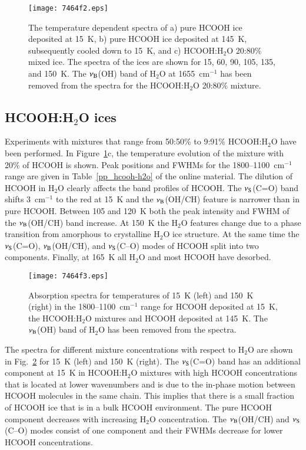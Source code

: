 \documentclass{aa}
\begin{document}
\begin{figure*}
\centering
\texttt{[image: 7464f2.eps]}
\caption{The temperature dependent spectra of a) pure HCOOH ice
deposited at 15~K, b) pure HCOOH ice deposited at 145~K, subsequently
cooled down to 15~K, and c) HCOOH:H$_2$O 20:80\% mixed ice. The
spectra of the ices are shown for 15, 60, 90, 105, 135, and 150~K. The
$\nu_{\rm B}$(OH) band of H$_2$O at 1655~cm$^{-1}$ has been removed
from the spectra for the HCOOH:H$_2$O 20:80\%
mixture.}\label{purespec}
\end{figure*}

\subsection{HCOOH:H$_2$O ices}
\label{hcooh-h2o}

Experiments with mixtures that range from 50:50\% to 9:91\%
HCOOH:H$_2$O have been performed. In Figure~\ref{purespec}c, the
temperature evolution of the mixture with 20\% of HCOOH is shown. Peak
positions and FWHMs for the 1800--1100~cm$^{-1}$ range are given in
Table~\ref{pp_hcooh-h2o} of the online material. The dilution of HCOOH
in H$_2$O clearly affects the band profiles of HCOOH. The $\nu_{\rm
S}$(C=O) band shifts 3~cm$^{-1}$ to the red at 15~K and the $\nu_{\rm
B}$(OH/CH) feature is narrower than in pure HCOOH. Between 105 and
120~K both the peak intensity and FWHM of the $\nu_{\rm B}$(OH/CH)
band increase. At 150~K the H$_2$O features change due to a phase
transition from amorphous to crystalline H$_2$O ice structure. At the
same time the $\nu_{\rm S}$(C=O), $\nu_{\rm B}$(OH/CH), and $\nu_{\rm
S}$(C--O) modes of HCOOH split into two components. Finally, at 165~K
all H$_2$O and most HCOOH have desorbed.

\begin{figure}
\centering \texttt{[image: 7464f3.eps]}
\caption{Absorption spectra for temperatures of 15~K (left) and 150~K
(right) in the 1800--1100~cm$^{-1}$ range for HCOOH deposited at 15~K,
the HCOOH:H$_2$O mixtures and HCOOH deposited at 145~K. The $\nu_{\rm
B}$(OH) band of H$_2$O has been removed from the
spectra.\label{h2o_conc}}
\end{figure}

The spectra for different mixture concentrations with respect to
H$_2$O are shown in Fig.~\ref{h2o_conc} for 15~K (left) and 150~K
(right). The $\nu_{\rm S}$(C=O) band has an additional component at
15~K in HCOOH:H$_2$O mixtures with high HCOOH concentrations that is
located at lower wavenumbers and is due to the in-phase motion between
HCOOH molecules in the same chain. This implies that there is a small
fraction of HCOOH ice that is in a bulk HCOOH environment. The pure
HCOOH component decreases with increasing H$_2$O concentration. The
$\nu_{\rm B}$(OH/CH) and $\nu_{\rm S}$(C--O) modes consist of one
component and their FWHMs decrease for lower HCOOH concentrations.
\end{document}
